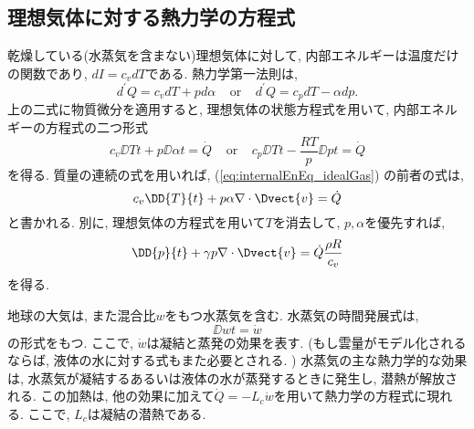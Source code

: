 \subsection{理想気体に対する熱力学の方程式}
乾燥している(水蒸気を含まない)理想気体に対して, 内部エネルギーは温度だけの関数であり, $dI=c_v dT$である. 
熱力学第一法則は, 
\begin{equation}
 d^\prime Q = c_v dT + pd\alpha \;\;\;\; \text{or} \;\;\;\;
 d^\prime Q = c_p dT - \alpha dp. 
 \label{eq:thermodyn_first_law_twoForms}
\end{equation}
上の二式に物質微分を適用すると, 理想気体の状態方程式を用いて, 
内部エネルギーの方程式の二つ形式
\begin{equation}
 c_v \DD{T}{t} + p \DD{\alpha}{t} = \dot{Q} \;\;\;\; \text{or} \;\;\;\;
 c_p \DD{T}{t} - \dfrac{RT}{p} \DD{p}{t} = \dot{Q}
 \label{eq:internalEnEq_idealGas}
\end{equation}
を得る. 
質量の連続の式を用いれば, (\ref{eq:internalEnEq_idealGas}) の前者の式は, 
\begin{equation}
 c_v \DD{T}{t} + p\alpha \nabla \cdot \Dvect{v} = \dot{Q}
 \label{eq:thermodynEq_forIdealGas_usingTP}
\end{equation}
と書かれる. 
別に, 理想気体の方程式を用いて$T$を消去して, $p,\alpha$を優先すれば, 
\begin{equation}
 \DD{p}{t} + \gamma p \nabla \cdot \Dvect{v} = \dot{Q} \dfrac{\rho R}{c_v}
 \label{eq:thermodynEq_forIdealGas_usingPV}
\end{equation}
を得る. 

地球の大気は, また混合比$w$をもつ水蒸気を含む. 
水蒸気の時間発展式は,
\begin{equation}
 \DD{w}{t} = \dot{w}
\end{equation}
の形式をもつ. 
ここで, $\dot{w}$は凝結と蒸発の効果を表す. 
(もし雲量がモデル化されるならば, 液体の水に対する式もまた必要とされる. )
水蒸気の主な熱力学的な効果は, 水蒸気が凝結するあるいは液体の水が蒸発するときに発生し,  
潜熱が解放される. 
この加熱は, 他の効果に加えて$\dot{Q}=-L_c \dot{w}$を用いて熱力学の方程式に現れる. 
ここで, $L_c$は凝結の潜熱である. 

